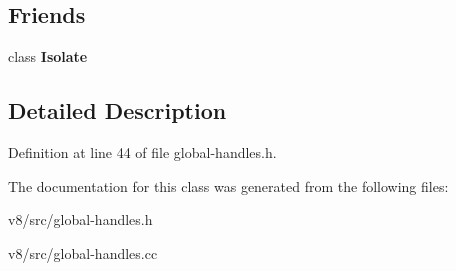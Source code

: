 \subsection*{Friends}
\begin{DoxyCompactItemize}
\item 
\mbox{\label{classv8_1_1internal_1_1GlobalHandles_aba4f0964bdacf2bbf62cf876e5d28d0a}} 
class {\bfseries Isolate}
\end{DoxyCompactItemize}


\subsection{Detailed Description}


Definition at line 44 of file global-\/handles.\+h.



The documentation for this class was generated from the following files\+:\begin{DoxyCompactItemize}
\item 
v8/src/global-\/handles.\+h\item 
v8/src/global-\/handles.\+cc\end{DoxyCompactItemize}

